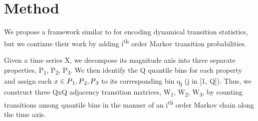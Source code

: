 \documentclass{turabian-thesis}
\begin{document}



\section{Method}

We propose a framework similar to \cite{wang_encoding_nodate}  for encoding dynamical transition statistics, but we continue their work by adding i\textsuperscript{th} order Markov transition probabilities.

Given a time series X, we decompose its magnitude axis into three separate properties, P\textsubscript{1},  P\textsubscript{2},  P\textsubscript{3}. We then identify the Q quantile bins for each property  and assign each $x \in P\textsubscript{1},  P\textsubscript{2},  P\textsubscript{3}$ to its corresponding bin q\textsubscript{j} (j in [1, Q]). Thus, we construct three QxQ adjacency transition matrices, W\textsubscript{1}, W\textsubscript{2}, W\textsubscript{3}, by counting transitions among quantile bins in the manner of an i\textsuperscript{th} order Markov chain along the time axis.
\end{document}
